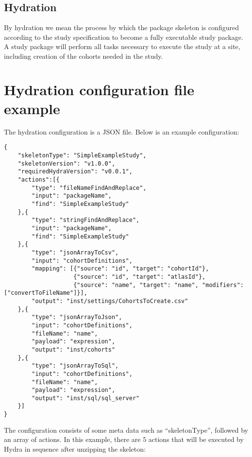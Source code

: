 \documentclass[]{article}
\begin{document}
\hypertarget{hydration}{%
\subsection{Hydration}\label{hydration}}

By hydration we mean the process by which the package skeleton is
configured according to the study specification to become a fully
executable study package. A study package will perform all tasks
necessary to execute the study at a site, including creation of the
cohorts needed in the study.

\hypertarget{hydration-configuration-file-example}{%
\section{Hydration configuration file
example}\label{hydration-configuration-file-example}}

The hydration configuration is a JSON file. Below is an example
configuration:

\begin{verbatim}
{
    "skeletonType": "SimpleExampleStudy",
    "skeletonVersion": "v1.0.0",
    "requiredHydraVersion": "v0.0.1",
    "actions":[{
        "type": "fileNameFindAndReplace",
        "input": "packageName",
        "find": "SimpleExampleStudy"
    },{
        "type": "stringFindAndReplace",
        "input": "packageName",
        "find": "SimpleExampleStudy"
    },{
        "type": "jsonArrayToCsv",
        "input": "cohortDefinitions",
        "mapping": [{"source": "id", "target": "cohortId"},
                    {"source": "id", "target": "atlasId"},
                    {"source": "name", "target": "name", "modifiers": ["convertToFileName"]}],
        "output": "inst/settings/CohortsToCreate.csv"
    },{
        "type": "jsonArrayToJson",
        "input": "cohortDefinitions",
        "fileName": "name",
        "payload": "expression",
        "output": "inst/cohorts"
    },{
        "type": "jsonArrayToSql",
        "input": "cohortDefinitions",
        "fileName": "name",
        "payload": "expression",
        "output": "inst/sql/sql_server"
    }]
}
\end{verbatim}

The configuration consists of some meta data such as ``skeletonType'',
followed by an array of actions. In this example, there are 5 actions
that will be executed by Hydra in sequence after unzipping the skeleton:
\end{document}
